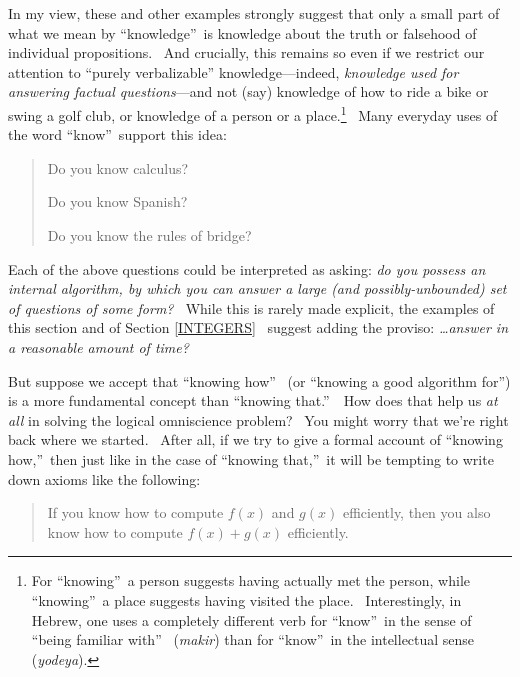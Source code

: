 \documentclass[12pt,onecolumn]{article}%
\begin{document}
In my view, these and other examples strongly suggest that only a small part
of what we mean by \textquotedblleft knowledge\textquotedblright\ is knowledge
about the truth or falsehood of individual propositions. \ And crucially, this
remains so even if we restrict our attention to \textquotedblleft purely
verbalizable\textquotedblright\textit{ }knowledge---indeed, \textit{knowledge
used for answering factual questions}---and not (say) knowledge of how to ride
a bike or swing a golf club, or knowledge of a person or a place.\footnote{For
\textquotedblleft knowing\textquotedblright\ a person suggests having actually
met the person, while \textquotedblleft knowing\textquotedblright\ a place
suggests having visited the place. \ Interestingly, in Hebrew, one uses a
completely different verb for \textquotedblleft know\textquotedblright\ in the
sense of \textquotedblleft being familiar with\textquotedblright%
\ (\textit{makir}) than for \textquotedblleft know\textquotedblright\ in the
intellectual sense (\textit{yodeya}).} \ Many everyday uses of the word
\textquotedblleft know\textquotedblright\ support this idea:

\begin{quotation}
\noindent Do you know calculus?

\noindent Do you know Spanish?

\noindent Do you know the rules of bridge?
\end{quotation}

Each of the above questions could be interpreted as asking: \textit{do you
possess an internal algorithm, by which you can answer a large (and
possibly-unbounded) set of questions of some form? \ }While this is rarely
made explicit, the examples of this section and of Section \ref{INTEGERS}%
\ suggest adding the proviso: \textit{\ldots answer in a reasonable amount of
time?}

But suppose we accept that \textquotedblleft knowing how\textquotedblright%
\ (or \textquotedblleft knowing a good algorithm for\textquotedblright) is a
more fundamental concept than \textquotedblleft knowing
that.\textquotedblright\ \ How does that help us \textit{at all} in solving
the logical omniscience problem? \ You might worry that we're right back where
we started. \ After all, if we try to give a formal account of
\textquotedblleft knowing how,\textquotedblright\ then just like in the case
of \textquotedblleft knowing that,\textquotedblright\ it will be tempting to
write down axioms like the following:

\begin{quotation}
\noindent If you know how to compute $f\left(  x\right)  $ and $g\left(
x\right)  $ efficiently, then you also know how to compute $f\left(  x\right)
+g\left(  x\right)  $ efficiently.
\end{quotation}
\end{document}
